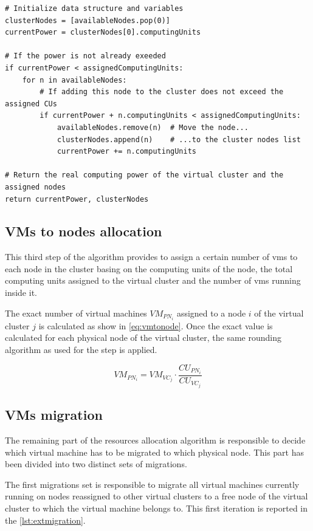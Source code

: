 \lstset{language=python,caption=Nodes to virtual cluster allocation,label=lst:nodetovc}
\begin{lstlisting}
# Initialize data structure and variables
clusterNodes = [availableNodes.pop(0)]
currentPower = clusterNodes[0].computingUnits

# If the power is not already exeeded
if currentPower < assignedComputingUnits:
	for n in availableNodes:
		# If adding this node to the cluster does not exceed the assigned CUs
		if currentPower + n.computingUnits < assignedComputingUnits:
			availableNodes.remove(n)  # Move the node...
			clusterNodes.append(n)    # ...to the cluster nodes list
			currentPower += n.computingUnits

# Return the real computing power of the virtual cluster and the assigned nodes
return currentPower, clusterNodes
\end{lstlisting}

\subsection{VMs to nodes allocation}

This third step of the algorithm provides to assign a certain number of \glspl{vm} to each node in the cluster basing on the computing units of the node, the total computing units assigned to the virtual cluster and the number of \glspl{vm} running inside it.

The exact number of virtual machines $VM_{PN_i}$ assigned to a node $i$ of the virtual cluster $j$ is calculated as show in \autoref{eq:vmtonode}. Once the exact value is calculated for each physical node of the virtual cluster, the same rounding algorithm as used for the \emph{} step is applied.

\begin{equation}
	\label{eq:vmtonode}
	VM_{PN_i} = VM_{VC_j} \cdot \frac{CU_{PN_i}}{CU_{VC_j}}
\end{equation}

\subsection{VMs migration}

The remaining part of the resources allocation algorithm is responsible to decide which virtual machine has to be migrated to which physical node. This part has been divided into two distinct sets of migrations.

The first migrations set is responsible to migrate all virtual machines currently running on nodes reassigned to other virtual clusters to a free node of the virtual cluster to which the virtual machine belongs to. This first iteration is reported in the \autoref{lst:extmigration}.

